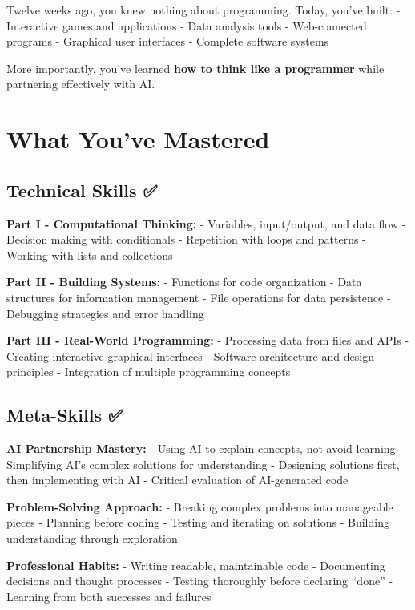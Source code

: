 \documentclass[
  letterpaper,
  DIV=11,
  numbers=noendperiod,
  oneside]{scrreprt}
\begin{document}
Twelve weeks ago, you knew nothing about programming. Today, you've
built: - Interactive games and applications - Data analysis tools -
Web-connected programs - Graphical user interfaces - Complete software
systems

More importantly, you've learned \textbf{how to think like a programmer}
while partnering effectively with AI.

\section{What You've Mastered}\label{what-youve-mastered}

\subsection{Technical Skills ✅}\label{technical-skills}

\textbf{Part I - Computational Thinking:} - Variables, input/output, and
data flow - Decision making with conditionals - Repetition with loops
and patterns - Working with lists and collections

\textbf{Part II - Building Systems:} - Functions for code organization -
Data structures for information management - File operations for data
persistence - Debugging strategies and error handling

\textbf{Part III - Real-World Programming:} - Processing data from files
and APIs - Creating interactive graphical interfaces - Software
architecture and design principles - Integration of multiple programming
concepts

\subsection{Meta-Skills ✅}\label{meta-skills}

\textbf{AI Partnership Mastery:} - Using AI to explain concepts, not
avoid learning - Simplifying AI's complex solutions for understanding -
Designing solutions first, then implementing with AI - Critical
evaluation of AI-generated code

\textbf{Problem-Solving Approach:} - Breaking complex problems into
manageable pieces - Planning before coding - Testing and iterating on
solutions - Building understanding through exploration

\textbf{Professional Habits:} - Writing readable, maintainable code -
Documenting decisions and thought processes - Testing thoroughly before
declaring ``done'' - Learning from both successes and failures
\end{document}
